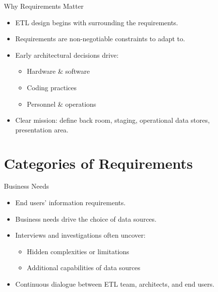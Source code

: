 \documentclass[aspectratio=169]{beamer}
\begin{document}
\begin{frame}{Why Requirements Matter}
    \begin{itemize}
        \item ETL design begins with surrounding the requirements.
        \item Requirements are non-negotiable constraints to adapt to.
        \item Early architectural decisions drive:
        \begin{itemize}
            \item Hardware \& software
            \item Coding practices
            \item Personnel \& operations
        \end{itemize}
        \item Clear mission: define back room, staging, operational data stores, presentation area.
    \end{itemize}
\end{frame}

\section{Categories of Requirements}

\begin{frame}{Business Needs}
    \begin{itemize}
        \item End users’ information requirements.
        \item Business needs drive the choice of data sources.
        \item Interviews and investigations often uncover:
        \begin{itemize}
            \item Hidden complexities or limitations
            \item Additional capabilities of data sources
        \end{itemize}
        \item Continuous dialogue between ETL team, architects, and end users.
    \end{itemize}
\end{frame}
\end{document}
